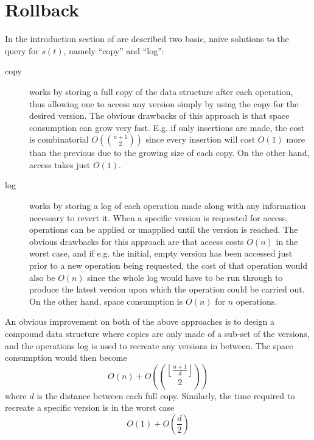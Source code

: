 
\section{Rollback}

In the introduction section of \cite{Tsotras1995237} are described two basic,
na\"ive solutions to the query for $s(t)$, namely ``copy'' and ``log'':
\begin{description}
  \item[copy] works by storing a full copy of the data structure after each
  operation, thus allowing one to access any version simply by using the copy
  for the desired version. The obvious drawbacks of this approach is that space
  consumption can grow very fast. E.g. if only insertions are made, the cost is
  combinatorial $O\left(\binom{n+1}{2}\right)$ since every insertion will cost
  $O(1)$ more than the previous due to the growing size of each copy. On the
  other hand, access takes just $O(1)$.

  \item[log] works by storing a log of each operation made along with any
  information necessary to revert it. When a specific version is requested for
  access, operations can be applied or unapplied until the version is reached. 
  The obvious drawbacks for this approach are that access costs $O(n)$ in the 
  worst case, and if e.g. the initial, empty version has been accessed just 
  prior to a new operation being requested, the cost of that operation would 
  also be $O(n)$ since the whole log would have to be run through to produce 
  the latest version upon which the operation could be carried out. On the other
  hand, space consumption is $O(n)$ for $n$ operations.
\end{description}

An obvious improvement on both of the above approaches is to design a compound
data structure where copies are only made of a sub-set of the versions, and the
operations log is used to recreate any versions in between. The space
consumption would then become
$$O(n)+O\left(\binom{\left\lfloor{\frac{n+1}{d}}\right\rfloor}{2}\right)$$ where
$d$ is the distance between each full copy. Similarly, the time required to
recreate a specific version is in the worst case
$$O(1)+O\left(\frac{d}{2}\right)$$

